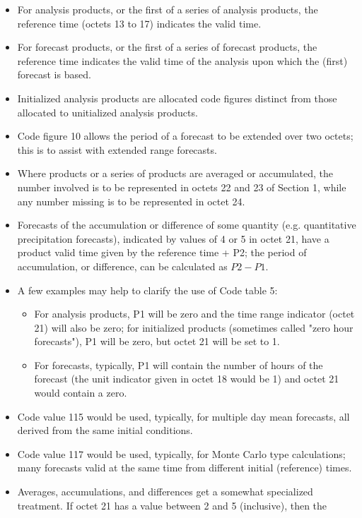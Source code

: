 \documentclass[final,12pt,a4paper,twoside]{book}
\begin{document}
\begin{itemize}
\item For analysis products, or the first of a series of analysis products, the reference time (octets 13 to 17) indicates the valid time.
\item For forecast products, or the first of a series of forecast products, the reference time indicates the valid time of the analysis upon which the (first) forecast is based.
\item Initialized analysis products are allocated code figures distinct from those allocated to unitialized analysis products.
\item Code figure 10 allows the period of a forecast to be extended over two octets; this is to assist with extended range forecasts.
\item Where products or a series of products are averaged or accumulated, the number involved is to be represented in octets 22 and 23 of Section 1, while any number missing is to be represented in octet 24.
\item Forecasts of the accumulation or difference of some quantity (e.g. quantitative precipitation forecasts), indicated by values of 4 or 5 in octet 21, have a product valid time given by the reference time + P2; the period of accumulation, or difference, can be calculated as $P2 - P1$.
\item A few examples may help to clarify the use of Code table 5:
  \begin{itemize}
  \item For analysis products, P1 will be zero and the time range indicator
	(octet 21) will also be zero; for initialized products (sometimes
	called "zero hour forecasts"), P1 will be zero, but octet 21 will be
	set to 1.
  \item For forecasts, typically, P1  will contain the number of hours of the
	forecast (the unit indicator given in octet 18 would be 1) and octet 21
	would contain a zero.
  \end{itemize}
\item Code value 115 would be used, typically, for multiple day mean forecasts,
      all derived from the same initial conditions.
\item Code value 117 would be used, typically, for Monte Carlo type
      calculations; many forecasts valid at the same time from different
      initial (reference) times.
\item Averages, accumulations, and differences get a somewhat specialized
      treatment. If octet 21 has a value between 2 and 5 (inclusive), then the

\end{itemize}
\end{document}
